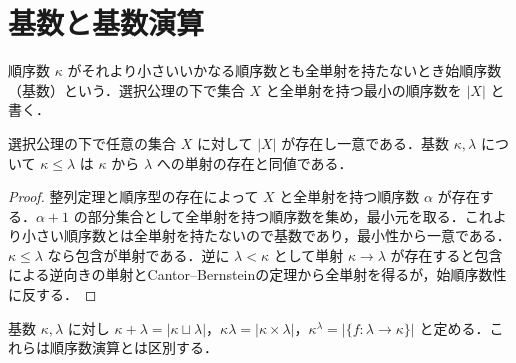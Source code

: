 \section{基数と基数演算}
\begin{defn}[基数]
順序数 $\kappa$ がそれより小さいいかなる順序数とも全単射を持たないとき始順序数（基数）という．選択公理の下で集合 $X$ と全単射を持つ最小の順序数を $|X|$ と書く．
\end{defn}
\begin{prop}[基数の存在と比較]
選択公理の下で任意の集合 $X$ に対して $|X|$ が存在し一意である．基数 $\kappa,\lambda$ について $\kappa\le\lambda$ は $\kappa$ から $\lambda$ への単射の存在と同値である．
\end{prop}
\begin{proof}
整列定理と順序型の存在によって $X$ と全単射を持つ順序数 $\alpha$ が存在する．$\alpha+1$ の部分集合として全単射を持つ順序数を集め，最小元を取る．これより小さい順序数とは全単射を持たないので基数であり，最小性から一意である．$\kappa\le\lambda$ なら包含が単射である．逆に $\lambda<\kappa$ として単射 $\kappa\to\lambda$ が存在すると包含による逆向きの単射とCantor–Bernsteinの定理から全単射を得るが，始順序数性に反する．
\end{proof}
\begin{defn}
基数 $\kappa,\lambda$ に対し $\kappa+\lambda=|\kappa\sqcup\lambda|$，$\kappa\lambda=|\kappa\times\lambda|$，$\kappa^\lambda=|\{f:\lambda\to\kappa\}|$ と定める．これらは順序数演算とは区別する．
\end{defn}
